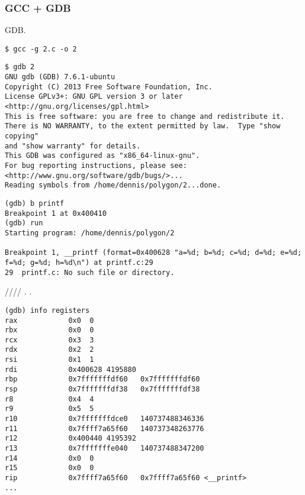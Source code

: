 \ifdefined\IncludeGDB
\subsubsection{GCC + GDB}

 \ac{GDB}.

\begin{lstlisting}
$ gcc -g 2.c -o 2
\end{lstlisting}

\begin{lstlisting}
$ gdb 2
GNU gdb (GDB) 7.6.1-ubuntu
Copyright (C) 2013 Free Software Foundation, Inc.
License GPLv3+: GNU GPL version 3 or later <http://gnu.org/licenses/gpl.html>
This is free software: you are free to change and redistribute it.
There is NO WARRANTY, to the extent permitted by law.  Type "show copying"
and "show warranty" for details.
This GDB was configured as "x86_64-linux-gnu".
For bug reporting instructions, please see:
<http://www.gnu.org/software/gdb/bugs/>...
Reading symbols from /home/dennis/polygon/2...done.
\end{lstlisting}

\begin{lstlisting}[caption=\RU{ставим точку останова на \printf{,} запускаем}\EN{let's set the breakpoint to \printf{,} and run}]
(gdb) b printf
Breakpoint 1 at 0x400410
(gdb) run
Starting program: /home/dennis/polygon/2 

Breakpoint 1, __printf (format=0x400628 "a=%d; b=%d; c=%d; d=%d; e=%d; f=%d; g=%d; h=%d\n") at printf.c:29
29	printf.c: No such file or directory.
\end{lstlisting}

 \RSI/\RDX/\RCX// 
.
\RIP {} \printf{}.

\begin{lstlisting}
(gdb) info registers
rax            0x0	0
rbx            0x0	0
rcx            0x3	3
rdx            0x2	2
rsi            0x1	1
rdi            0x400628	4195880
rbp            0x7fffffffdf60	0x7fffffffdf60
rsp            0x7fffffffdf38	0x7fffffffdf38
r8             0x4	4
r9             0x5	5
r10            0x7fffffffdce0	140737488346336
r11            0x7ffff7a65f60	140737348263776
r12            0x400440	4195392
r13            0x7fffffffe040	140737488347200
r14            0x0	0
r15            0x0	0
rip            0x7ffff7a65f60	0x7ffff7a65f60 <__printf>
...
\end{lstlisting}

